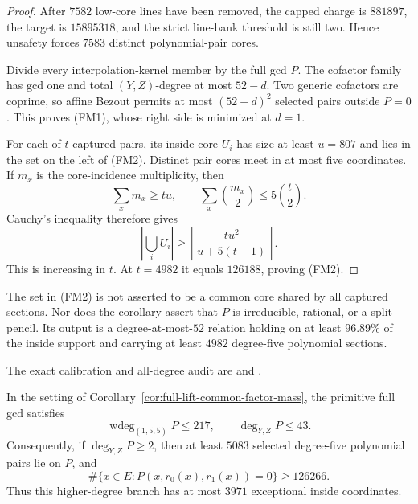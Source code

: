 \documentclass[11pt,a4paper]{amsart}
\numberwithin{equation}{section}
\theoremstyle{remark}
\begin{document}
\begin{proof}
After $7582$ low-core lines have been removed, the capped charge is
$881897$, the target is $15895318$, and the strict line-bank threshold is
still two.  Hence unsafety forces $7583$ distinct polynomial-pair cores.

Divide every interpolation-kernel member by the full gcd $P$.  The cofactor
family has gcd one and total $(Y,Z)$-degree at most $52-d$.  Two generic
cofactors are coprime, so affine Bezout permits at most $(52-d)^2$ selected
pairs outside $P=0$.  This proves (FM1), whose right side is minimized at
$d=1$.

For each of $t$ captured pairs, its inside core $U_i$ has size at least
$u=807$ and lies in the set on the left of (FM2).  Distinct pair cores meet
in at most five coordinates.  If $m_x$ is the core-incidence multiplicity,
then
\[
 \sum_xm_x\ge tu,
 \qquad
 \sum_x\binom{m_x}{2}\le5\binom{t}{2}.
\]
Cauchy's inequality therefore gives
\[
 \left|\bigcup_iU_i\right|
 \ge\left\lceil\frac{tu^2}{u+5(t-1)}\right\rceil.
\]
This is increasing in $t$.  At $t=4982$ it equals $126188$, proving (FM2).
\end{proof}

\begin{remark}
The set in (FM2) is not asserted to be a common core shared by all captured
sections.  Nor does the corollary assert that $P$ is irreducible, rational,
or a split pencil.  Its output is a degree-at-most-$52$ relation holding on
at least $96.89\%$ of the inside support and carrying at least $4982$
degree-five polynomial sections.

The exact calibration and all-degree audit are
and
.
\end{remark}

\begin{corollary}
\label{cor:full-lift-common-factor-weighted-degree}
In the setting of Corollary~\ref{cor:full-lift-common-factor-mass}, the
primitive full gcd satisfies
\[
 \operatorname{wdeg}_{(1,5,5)}P\le217,
 \qquad \deg_{Y,Z}P\le43.                       \tag{WD1}
\]
Consequently, if $\deg_{Y,Z}P\ge2$, then at least $5083$ selected
degree-five polynomial pairs lie on $P$, and
\[
 \#\{x\in E:P(x,r_0(x),r_1(x))=0\}\ge126266. \tag{WD2}
\]
Thus this higher-degree branch has at most $3971$ exceptional inside
coordinates.
\end{corollary}
\end{document}
